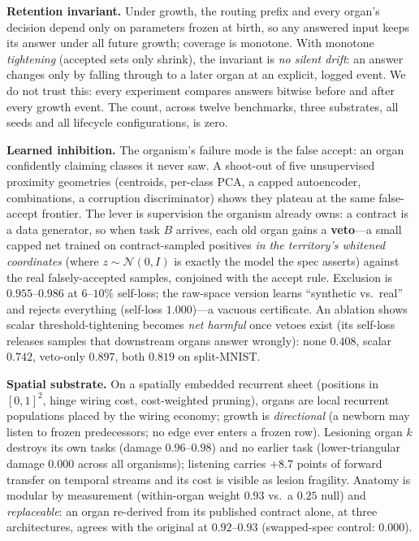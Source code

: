 \documentclass{article}
\begin{document}
\textbf{Retention invariant.} Under growth, the routing prefix and every
organ's decision depend only on parameters frozen at birth, so any answered
input keeps its answer under all future growth; coverage is monotone. With
monotone \emph{tightening} (accepted sets only shrink), the invariant is
\emph{no silent drift}: an answer changes only by falling through to a later
organ at an explicit, logged event. We do not trust this: every experiment
compares answers bitwise before and after every growth event. The count,
across twelve benchmarks, three substrates, all seeds and all lifecycle
configurations, is zero.

\textbf{Learned inhibition.} The organism's failure mode is
the false accept: an organ confidently claiming classes it never saw. A
shoot-out of five unsupervised proximity geometries (centroids, per-class PCA,
a capped autoencoder, combinations, a corruption discriminator) shows they
plateau at the same false-accept frontier. The lever is supervision the
organism already owns: a contract is a data generator, so when task $B$
arrives, each old organ gains a \textbf{veto}---a small capped net trained on
contract-sampled positives \emph{in the territory's whitened coordinates}
(where $z \sim \mathcal N(0, I)$ is exactly the model the spec asserts)
against the real falsely-accepted samples, conjoined with the accept rule.
Exclusion is $0.955$--$0.986$ at $6$--$10\%$ self-loss; the raw-space version
learns ``synthetic vs.\ real'' and rejects everything (self-loss $1.000$)---a
vacuous certificate. An ablation shows scalar threshold-tightening becomes
\emph{net harmful} once vetoes exist (its self-loss releases samples that
downstream organs answer wrongly): none $0.408$, scalar $0.742$, veto-only
$0.897$, both $0.819$ on split-MNIST.

\textbf{Spatial substrate.} On a spatially embedded recurrent sheet (positions
in $[0,1]^2$, hinge wiring cost, cost-weighted pruning), organs are local
recurrent populations placed by the wiring economy; growth is
\emph{directional} (a newborn may listen to frozen predecessors; no edge ever
enters a frozen row). Lesioning organ $k$ destroys its own tasks (damage
$0.96$--$0.98$) and no earlier task (lower-triangular damage $0.000$ across
all organisms); listening carries $+8.7$ points of forward transfer on
temporal streams and its cost is visible as lesion fragility. Anatomy is
modular by measurement (within-organ weight $0.93$ vs.\ a $0.25$ null) and
\emph{replaceable}: an organ re-derived from its published contract alone, at
three architectures, agrees with the original at $0.92$--$0.93$
(swapped-spec control: $0.000$).
\end{document}
